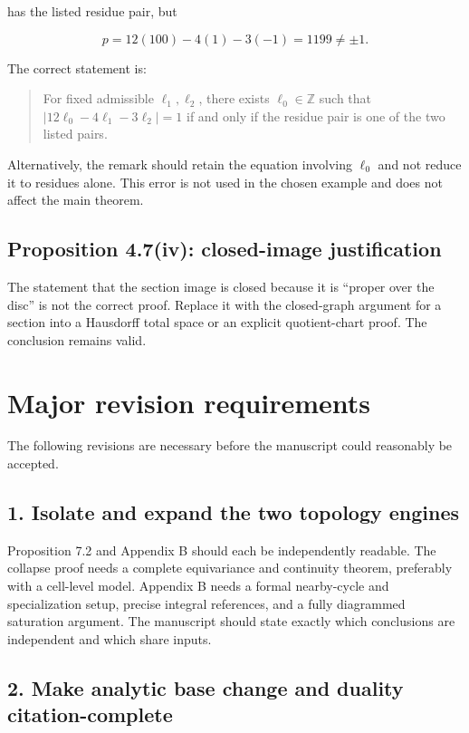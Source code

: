 \documentclass[
  10pt,
  letterpaper,
]{article}
\newcommand{\Z}{\mathbb Z}
\begin{document}
has the listed residue pair, but

\[
p=12(100)-4(1)-3(-1)=1199\ne\pm1.
\]

The correct statement is:

\begin{quote}
For fixed admissible \(\ell_1,\ell_2\), there exists \(\ell_0\in\Z\)
such that \(|12\ell_0-4\ell_1-3\ell_2|=1\) if and only if the residue
pair is one of the two listed pairs.
\end{quote}

Alternatively, the remark should retain the equation involving
\(\ell_0\) and not reduce it to residues alone. This error is not used
in the chosen example and does not affect the main theorem.

\subsection{Proposition 4.7(iv): closed-image
justification}\label{proposition-4.7iv-closed-image-justification}

The statement that the section image is closed because it is ``proper
over the disc'' is not the correct proof. Replace it with the
closed-graph argument for a section into a Hausdorff total space or an
explicit quotient-chart proof. The conclusion remains valid.

\section{Major revision requirements}\label{major-revision-requirements}

The following revisions are necessary before the manuscript could
reasonably be accepted.

\subsection{1. Isolate and expand the two topology
engines}\label{isolate-and-expand-the-two-topology-engines}

Proposition 7.2 and Appendix B should each be independently readable.
The collapse proof needs a complete equivariance and continuity theorem,
preferably with a cell-level model. Appendix B needs a formal
nearby-cycle and specialization setup, precise integral references, and
a fully diagrammed saturation argument. The manuscript should state
exactly which conclusions are independent and which share inputs.

\subsection{2. Make analytic base change and duality
citation-complete}\label{make-analytic-base-change-and-duality-citation-complete}
\end{document}
